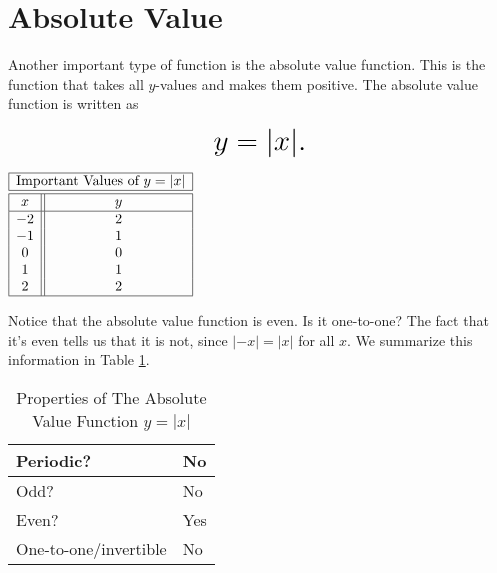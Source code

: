 \documentclass[nooutcomes]{ximera}
\begin{document}
\newpage


\section{Absolute Value}
Another important type of function is the absolute value function.  This is the function that takes all $y$-values and makes them positive.  The absolute value function is written as 

$$ \mbox{\huge $y=|x|.$}$$ 

\begin{image}
\end{image}

\begin{center}
\(
\begin{array}{ |c || c|  }
 \hline
 \multicolumn{2}{|c|}{\text{\normalfont Important Values of } y=|x|} \\
\hline
 \hline
 x & y\\
 \hline
 -2&2\\ 
-1&1\\ 
0&0\\
 1&1\\
 2&2\\
 \hline
\end{array}
\)
\end{center}

Notice that the absolute value function is even. Is it one-to-one? The fact that it's even tells us that it is not, since $|-x| = |x|$ for all $x$. We summarize this information in Table \ref{tab:absproperties}.

\begin{table}[h]
\caption{\label{tab:absproperties}Properties of The Absolute Value Function $y = |x|$}
\centering
\begin{tabular}{l|l}
Periodic? & No\\ \hline
Odd? &  No \\ \hline
Even? & Yes \\ \hline
One-to-one/invertible & No
\end{tabular}
\end{table}
\end{document}
